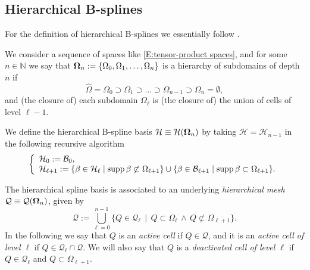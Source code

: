 \documentclass[a4paper]{siamltex1213}
\newcommand{\Rd}{\color{red}}
\newcommand\NN{\mathbb N}
\newcommand\BB{\mathcal B}
\newcommand\QQ{\mathcal Q}
\newcommand\HH{\mathcal H}
\let\hat\widehat
\begin{document}
\subsection{Hierarchical B-splines} \label{sec:hierarchical}
For the definition of hierarchical B-splines we {\Rd essentially follow \cite{Kraft,Vuong_giannelli_juttler_simeon}}. 

\begin{definition} \label{def:hierarchical}
We consider a sequence of spaces like \eqref{E:tensor-product spaces}, and for some $n \in \NN$ we say that ${\bf\Omega}_n := \{\Omega_0,\Omega_1,\dots,\Omega_n\}$ is a hierarchy of subdomains of depth $n$ if
\begin{equation*}
\hat \Omega = \Omega_0 \supset \Omega_1 \supset \dots \supset 
\Omega_{n-1}\supset \Omega_n = \emptyset,
\end{equation*}
and (the closure of) each subdomain $\Omega_\ell$ is (the closure of) the union of cells of level $\ell-1$.

We define the hierarchical B-spline basis ${\HH} \equiv {\HH}({\bf\Omega}_n)$ by taking $\HH = \HH_{n-1}$ in the following recursive algorithm
\begin{equation}\label{E:Hierarchical basis}
\left \{
\begin{array}{l}
\HH_0 := \BB_0, \\
\HH_{\ell+1} := \{\beta \in \HH_\ell \mid \supp \beta \not \subset \Omega_{\ell+1} \} \cup \{\beta \in \BB_{\ell+1} \mid \supp \beta \subset \Omega_{\ell+1}\}.
\end{array}
\right.
\end{equation} 

\end{definition}
The hierarchical spline basis is associated to an underlying \emph{hierarchical mesh} $\QQ \equiv \QQ({\bf\Omega}_n)$, given by
\begin{equation}\label{E:hierarchical mesh}
\QQ:= \bigcup_{\ell = 0}^{n-1} \{ Q\in\QQ_\ell\,\mid\, Q\subset \Omega_\ell 
\,\wedge\, Q\not\subset \Omega_{\ell+1}\}.
\end{equation}
In the following we say that $Q$ is an \emph{active cell} if $Q \in \QQ$, and it is an \emph{active cell of level $\ell$} if $Q \in \QQ_\ell \cap \QQ$. We will also say that $Q$ is a \emph{deactivated cell of level $\ell$} if $Q \in \QQ_\ell$ and $Q \subset \Omega_{\ell+1}$. 
\end{document}
